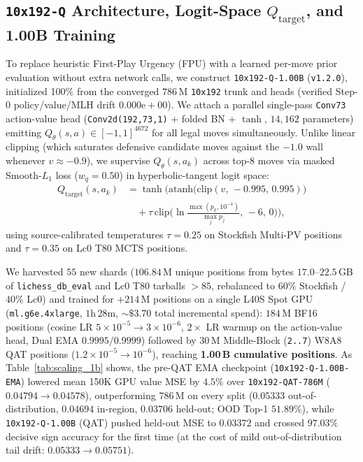\documentclass[10pt,twocolumn]{article}
\begin{document}
\subsection{\texttt{10x192-Q} Architecture, Logit-Space $Q_{\mathrm{target}}$, and 1.00B Training}
\label{sec:1b_qhead}
To replace heuristic First-Play Urgency (FPU) with a learned per-move prior evaluation without extra network calls, we construct \texttt{10x192-Q-1.00B} (\texttt{v1.2.0}), initialized 100\% from the converged $786$\,M \texttt{10x192} trunk and heads (verified Step-0 policy/value/MLH drift $0.000\text{e}{+}00$). We attach a parallel single-pass \texttt{Conv73} action-value head (\texttt{Conv2d(192,73,1)} + folded BN + $\tanh$, $14{,}162$ parameters) emitting $Q_\theta(s,a) \in [-1,1]^{4672}$ for all legal moves simultaneously. Unlike linear clipping (which saturates defensive candidate moves against the $-1.0$ wall whenever $v \approx -0.9$), we supervise $Q_\theta(s,a_k)$ across top-8 moves via masked Smooth-$L_1$ loss ($w_q = 0.50$) in hyperbolic-tangent logit space:
\begin{align}
  Q_{\mathrm{target}}(s,a_k) &= \tanh\!\Big(\mathrm{atanh}\!\big(\mathrm{clip}(v,\,-0.995,\,0.995)\big) \nonumber\\
  &\quad + \tau\,\mathrm{clip}\!\Big(\ln\!\frac{\max(p_k,10^{-4})}{\max_j p_j},\,-6,\,0\Big)\Big),
  \label{eq:qtarget}
\end{align}
using source-calibrated temperatures $\tau = 0.25$ on Stockfish Multi-PV positions and $\tau = 0.35$ on Lc0 T80 MCTS positions.

We harvested $55$ new shards ($106.84$\,M unique positions from bytes $17.0\text{--}22.5$\,GB of \texttt{lichess\_db\_eval} and Lc0 T80 tarballs $>85$, rebalanced to $60\%$ Stockfish / $40\%$ Lc0) and trained for $+214$\,M positions on a single L40S Spot GPU (\texttt{ml.g6e.4xlarge}, $1\text{h}\,28\text{m}$, ${\sim}\$3.70$ total incremental spend): $184$\,M BF16 positions (cosine LR $5\times 10^{-5}\to 3\times 10^{-6}$, $2\times$ LR warmup on the action-value head, Dual EMA $0.9995/0.9999$) followed by $30$\,M Middle-Block (\texttt{2..7}) W8A8 QAT positions ($1.2\times 10^{-5}\to 10^{-6}$), reaching \textbf{1.00\,B cumulative positions}. As Table~\ref{tab:scaling_1b} shows, the pre-QAT EMA checkpoint (\texttt{10x192-Q-1.00B-EMA}) lowered mean 150K GPU value MSE by $4.5\%$ over \texttt{10x192-QAT-786M} ($0.04794 \to 0.04578$), outperforming $786$\,M on every split ($0.05333$ out-of-distribution, $0.04694$ in-region, $0.03706$ held-out; OOD Top-1 $51.89\%$), while \texttt{10x192-Q-1.00B} (QAT) pushed held-out MSE to $0.03372$ and crossed $97.03\%$ decisive sign accuracy for the first time (at the cost of mild out-of-distribution tail drift: $0.05333 \to 0.05751$).
\end{document}
